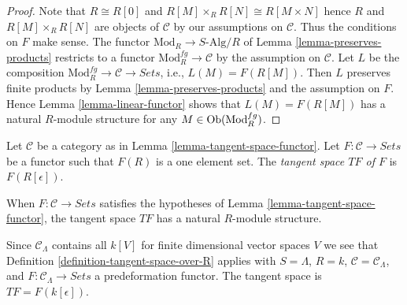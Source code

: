 \begin{proof}
Note that $R \cong R[0]$ and $R[M] \times_R R[N] \cong R[M \times N]$ hence
$R$ and $R[M] \times_R R[N]$ are objects of $\mathcal{C}$ by our assumptions on
$\mathcal{C}$. Thus the conditions on $F$ make sense.
The functor $\text{Mod}_R \to S\text{-Alg}/R$ of
Lemma \ref{lemma-preserves-products}
restricts to a functor $\text{Mod}^{fg}_R \to \mathcal{C}$
by the assumption on $\mathcal{C}$. Let $L$ be the composition
$\text{Mod}^{fg}_R \to \mathcal{C} \to \textit{Sets}$, i.e.,
$L(M) = F(R[M])$.
Then $L$ preserves finite products by
Lemma \ref{lemma-preserves-products}
and the assumption on $F$. Hence
Lemma \ref{lemma-linear-functor}
shows that $L(M) = F(R[M])$ has a natural $R$-module structure for any
$M \in \mathop{\mathrm{Ob}}\nolimits(\text{Mod}^{fg}_R)$.
\end{proof}

\begin{definition}
\label{definition-tangent-space-over-R}
Let $\mathcal{C}$ be a category as in
Lemma \ref{lemma-tangent-space-functor}.
Let $F : \mathcal{C} \to \textit{Sets}$ be a functor such that
$F(R)$ is a one element set. The {\it tangent space $TF$ of $F$} is
$F(R[\epsilon])$.
\end{definition}

\noindent
When $F : \mathcal{C} \to \textit{Sets}$ satisfies the hypotheses of
Lemma \ref{lemma-tangent-space-functor},
the tangent space $TF$ has a natural $R$-module structure.

\begin{example}
\label{example-tangent-space-functor}
Since $\mathcal{C}_\Lambda$ contains all $k[V]$ for finite dimensional
vector spaces $V$ we see that
Definition \ref{definition-tangent-space-over-R} applies with
$S = \Lambda$, $R = k$, $\mathcal{C} = \mathcal{C}_\Lambda$, and
$F : \mathcal{C}_\Lambda \to \textit{Sets}$ a
predeformation functor. The tangent space is $TF = F(k[\epsilon])$.
\end{example}

